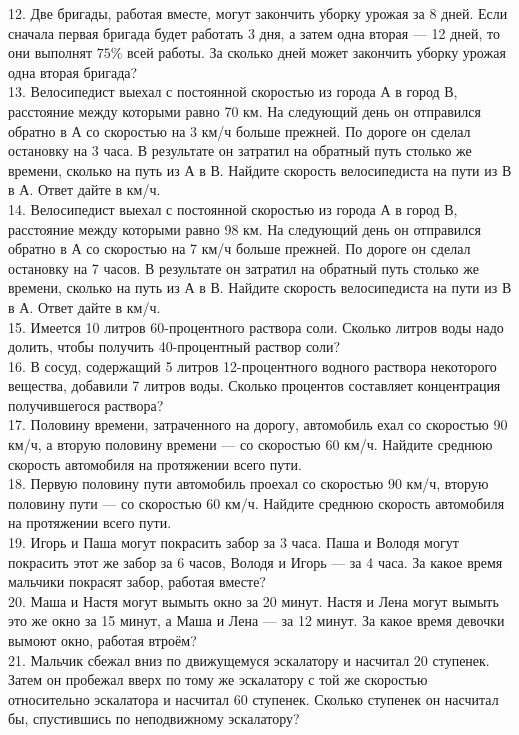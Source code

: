 \documentclass[12pt]{article}
\begin{document}
12. Две бригады, работая вместе, могут закончить уборку урожая за 8 дней. Если сначала первая бригада будет работать 3 дня, а затем одна вторая --- 12 дней, то они выполнят $75\%$ всей работы. За сколько дней может закончить уборку урожая одна вторая бригада?\\
13. Велосипедист выехал с постоянной скоростью из города А в город В, расстояние между которыми равно 70 км. На следующий день он отправился обратно в А со скоростью на 3 км/ч больше прежней. По дороге он сделал остановку на 3 часа. В результате он затратил на обратный путь столько же времени, сколько на путь из А в В. Найдите скорость велосипедиста на пути из В в А. Ответ дайте в км/ч.\\
14. Велосипедист выехал с постоянной скоростью из города А в город В, расстояние между которыми равно 98 км. На следующий день он отправился обратно в А со скоростью на 7 км/ч больше прежней. По дороге он сделал остановку на 7 часов. В результате он затратил на обратный путь столько же времени, сколько на путь из А в В. Найдите скорость велосипедиста на пути из В в А. Ответ дайте в км/ч.\\
15. Имеется 10 литров 60-процентного раствора соли. Сколько литров воды надо долить, чтобы получить 40-процентный раствор соли?\\
16. В сосуд, содержащий 5 литров 12-процентного водного раствора некоторого вещества, добавили 7 литров воды. Сколько процентов составляет концентрация получившегося раствора?\\
17. Половину времени, затраченного на дорогу, автомобиль ехал со скоростью 90 км/ч, а вторую половину времени --- со скоростью 60 км/ч. Найдите среднюю скорость автомобиля на протяжении всего пути.\\
18. Первую половину пути автомобиль проехал со скоростью 90 км/ч, вторую половину пути --- со скоростью 60 км/ч. Найдите среднюю скорость автомобиля на протяжении всего пути.\\
19. Игорь и Паша могут покрасить забор за 3 часа. Паша и Володя могут покрасить этот же забор за 6 часов, Володя и Игорь --- за 4 часа. За какое время мальчики покрасят забор, работая вместе?\\
20. Маша и Настя могут вымыть окно за 20 минут. Настя и Лена могут вымыть это же окно за 15 минут, а Маша и Лена --- за 12 минут. За какое время девочки вымоют окно, работая втроём?\\
21. Мальчик сбежал вниз по движущемуся эскалатору и насчитал 20 ступенек. Затем он пробежал вверх по тому же эскалатору с той же скоростью относительно эскалатора и насчитал 60 ступенек. Сколько ступенек он насчитал бы, спустившись по неподвижному эскалатору?\\
\end{document}
